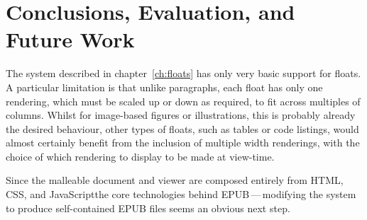 \chapter{Conclusions, Evaluation, and Future Work}\label{ch:conclusions}


The system described in chapter~\ref{ch:floats} has only very basic support for floats. A particular limitation is that unlike paragraphs, each float has only one rendering, which must be scaled up or down as required, to fit across multiples of columns. Whilst for image-based figures or illustrations, this is probably already the desired behaviour, other types of floats, such as tables or code listings, would almost certainly benefit from the inclusion of multiple width renderings, with the choice of which rendering to display to be made at view-time. %


Since the malleable document and viewer are composed entirely from HTML, CSS, and JavaScript\ed the core technologies behind EPUB\,---\,modifying the system to produce self-contained EPUB files seems an obvious next step.

